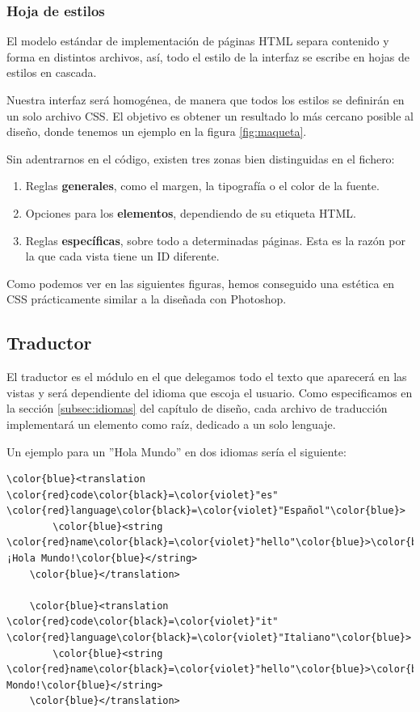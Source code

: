 \subsubsection{Hoja de estilos}

El modelo estándar de implementación de páginas \acrshort{HTML} separa contenido y forma en distintos archivos, así, todo el estilo de la interfaz se escribe en hojas de estilos en cascada.

Nuestra interfaz será homogénea, de manera que todos los estilos se definirán en un solo archivo \acrshort{CSS}. El objetivo es obtener un resultado lo más cercano posible al diseño, donde tenemos un ejemplo en la figura \ref{fig:maqueta}.

Sin adentrarnos en el código, existen tres zonas bien distinguidas en el fichero:

\begin{enumerate}
	\item Reglas \textbf{generales}, como el margen, la tipografía o el color de la fuente.
	\item Opciones para los \textbf{elementos}, dependiendo de su etiqueta \acrshort{HTML}.
	\item Reglas \textbf{específicas}, sobre todo a determinadas páginas. Esta es la razón por la que cada vista tiene un ID diferente.
\end{enumerate}

Como podemos ver en las siguientes figuras, hemos conseguido una estética en \acrshort{CSS} prácticamente similar a la diseñada con Photoshop.

\subsection{Traductor}

El traductor es el módulo en el que delegamos todo el texto que aparecerá en las vistas y será dependiente del idioma que escoja el usuario. Como especificamos en la sección \ref{subsec:idiomas} del capítulo de diseño, cada archivo de traducción implementará un elemento  como raíz, dedicado a un solo lenguaje.

Un ejemplo para un ''Hola Mundo'' en dos idiomas sería el siguiente:

\begin{Verbatim}[commandchars=\\\{\}]
	\color{blue}<translation \color{red}code\color{black}=\color{violet}"es" \color{red}language\color{black}=\color{violet}"Español"\color{blue}>
	    \color{blue}<string \color{red}name\color{black}=\color{violet}"hello"\color{blue}>\color{black}¡Hola Mundo!\color{blue}</string>
	\color{blue}</translation>

	\color{blue}<translation \color{red}code\color{black}=\color{violet}"it" \color{red}language\color{black}=\color{violet}"Italiano"\color{blue}>
		\color{blue}<string \color{red}name\color{black}=\color{violet}"hello"\color{blue}>\color{black}Ciao Mondo!\color{blue}</string>
	\color{blue}</translation>
\end{Verbatim}


